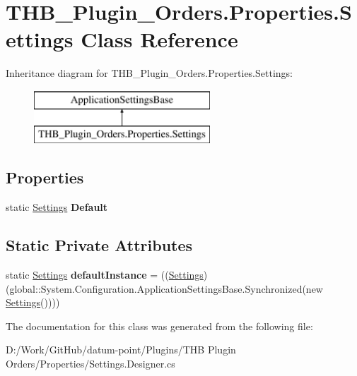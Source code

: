 \hypertarget{class_t_h_b___plugin___orders_1_1_properties_1_1_settings}{}\section{T\+H\+B\+\_\+\+Plugin\+\_\+\+Orders.\+Properties.\+Settings Class Reference}
\label{class_t_h_b___plugin___orders_1_1_properties_1_1_settings}
Inheritance diagram for T\+H\+B\+\_\+\+Plugin\+\_\+\+Orders.\+Properties.\+Settings\+:\begin{figure}[H]
\begin{center}
\leavevmode
\includegraphics[height=2.000000cm]{dd/d9e/class_t_h_b___plugin___orders_1_1_properties_1_1_settings}
\end{center}
\end{figure}
\subsection*{Properties}
\begin{DoxyCompactItemize}
\item 
\mbox{\label{class_t_h_b___plugin___orders_1_1_properties_1_1_settings_aa9bb1b48c0521b2a4e7d2d390dccd7ed}} 
static \mbox{\hyperlink{class_t_h_b___plugin___orders_1_1_properties_1_1_settings}{Settings}} {\bfseries Default}
\end{DoxyCompactItemize}
\subsection*{Static Private Attributes}
\begin{DoxyCompactItemize}
\item 
\mbox{\label{class_t_h_b___plugin___orders_1_1_properties_1_1_settings_af1617d6bc9802134b5f147a6eaa63627}} 
static \mbox{\hyperlink{class_t_h_b___plugin___orders_1_1_properties_1_1_settings}{Settings}} {\bfseries default\+Instance} = ((\mbox{\hyperlink{class_t_h_b___plugin___orders_1_1_properties_1_1_settings}{Settings}})(global\+::\+System.\+Configuration.\+Application\+Settings\+Base.\+Synchronized(new \mbox{\hyperlink{class_t_h_b___plugin___orders_1_1_properties_1_1_settings}{Settings}}())))
\end{DoxyCompactItemize}


The documentation for this class was generated from the following file\+:\begin{DoxyCompactItemize}
\item 
D\+:/\+Work/\+Git\+Hub/datum-\/point/\+Plugins/\+T\+H\+B Plugin Orders/\+Properties/Settings.\+Designer.\+cs\end{DoxyCompactItemize}
